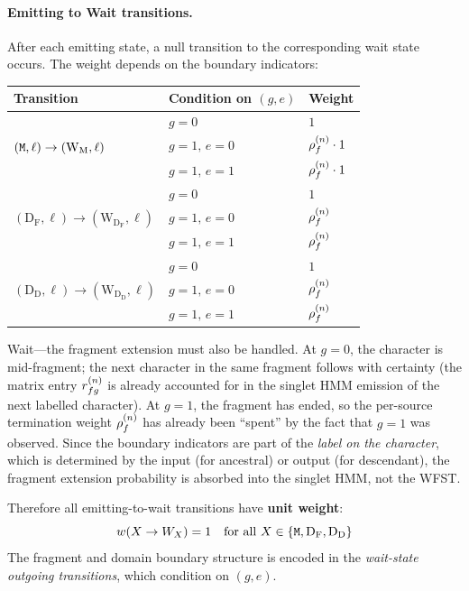 \paragraph{Emitting to Wait transitions.}
After each emitting state, a null transition to the corresponding wait state occurs.
The weight depends on the boundary indicators:

\begin{center}
\renewcommand{\arraystretch}{1.4}
\begin{tabular}{lll}
\hline
Transition & Condition on $(g, e)$ & Weight \\
\hline
\multirow{3}{*}{$({\tt M}, \ell) \to (\mathrm{W_M}, \ell)$}
  & $g=0$ & $1$ \\
  & $g=1,\, e=0$ & $\rho^{(n)}_f \cdot 1$ \\
  & $g=1,\, e=1$ & $\rho^{(n)}_f \cdot 1$ \\[2pt]
\multirow{3}{*}{$(\mathrm{D_F}, \ell) \to (\mathrm{W_{D_F}}, \ell)$}
  & $g=0$ & $1$ \\
  & $g=1,\, e=0$ & $\rho^{(n)}_f$ \\
  & $g=1,\, e=1$ & $\rho^{(n)}_f$ \\[2pt]
\multirow{3}{*}{$(\mathrm{D_D}, \ell) \to (\mathrm{W_{D_D}}, \ell)$}
  & $g=0$ & $1$ \\
  & $g=1,\, e=0$ & $\rho^{(n)}_f$ \\
  & $g=1,\, e=1$ & $\rho^{(n)}_f$ \\
\hline
\end{tabular}
\end{center}

Wait---the fragment extension must also be handled.
At $g=0$, the character is mid-fragment; the next character in the same
fragment follows with certainty (the matrix entry $r^{(n)}_{fg}$
is already accounted for in the singlet HMM emission of the next labelled
character).
At $g=1$, the fragment has ended, so the per-source termination weight
$\rho^{(n)}_f$ has already been ``spent'' by the fact that $g=1$
was observed.
Since the boundary indicators are part of the \emph{label on the character},
which is determined by the input (for ancestral) or output (for descendant),
the fragment extension probability is absorbed into the singlet HMM, not the WFST.

Therefore all emitting-to-wait transitions have \textbf{unit weight}:
\begin{equation}
\label{eq:emit-to-wait}
w(X \to W_X) = 1 \quad \text{for all } X \in \{{\tt M}, \mathrm{D_F}, \mathrm{D_D}\}
\end{equation}
The fragment and domain boundary structure is encoded in the
\emph{wait-state outgoing transitions}, which condition on $(g, e)$.



